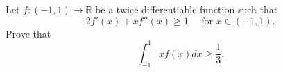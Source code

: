 Let \(f\colon (-1,1)\to \mathbb{R}\) be a twice differentiable function such that
\[2f'(x)+xf''(x)\geqslant 1 \quad \text{ for } x\in (-1,1).\]Prove that
\[\int_{-1}^{1}xf(x)dx\geqslant \frac{1}{3}.\]
